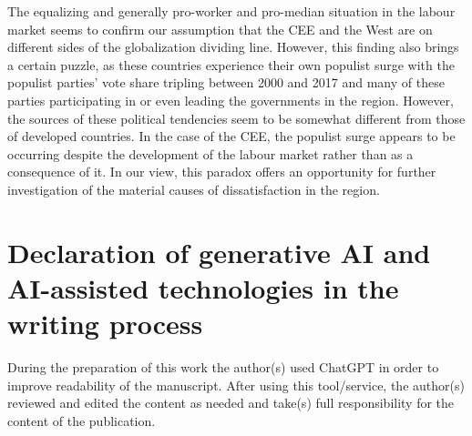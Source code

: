 \documentclass[11pt]{article}
\begin{document}
The equalizing and generally pro-worker and pro-median situation in the labour market seems to confirm our assumption that the CEE and the West are on different sides of the globalization dividing line. However, this finding also brings a certain puzzle, as these countries experience their own populist surge with the populist parties' vote share tripling between 2000 and 2017 and many of these parties participating in or even leading the governments in the region. However, the sources of these political tendencies seem to be somewhat different from those of developed countries. In the case of the CEE, the populist surge appears to be occurring despite the development of the labour market rather than as a consequence of it. In our view, this paradox offers an opportunity for further investigation of the material causes of dissatisfaction in the region.

\newpage

\section*{Declaration of generative AI and AI-assisted technologies in the writing process}
During the preparation of this work the author(s) used ChatGPT in order to improve readability of the manuscript. After using this tool/service, the author(s) reviewed and edited the content as needed and take(s) full responsibility for the content of the publication.









\newpage






\end{document}
